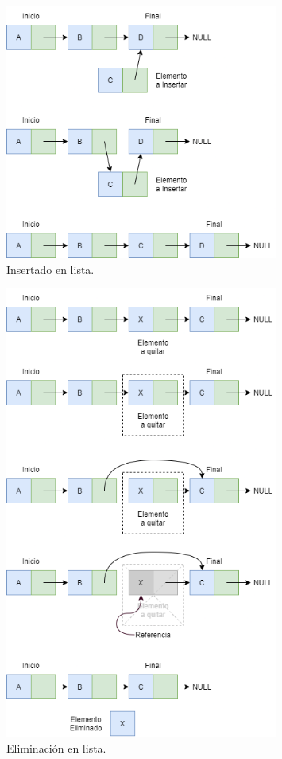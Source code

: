 \documentclass[titlepage,a4paper]{article}
\begin{document}
\begin{figure}[H]
\centering
\includegraphics[width=0.8\textwidth]{lista_insercion.png}
\caption{\label{fig:seq06}Insertado en lista.}
\end{figure}


\begin{figure}[H]
\centering
\includegraphics[width=0.8\textwidth]{lista_quitar.png}
\caption{\label{fig:seq07}Eliminación en lista.}
\end{figure}
\end{document}
